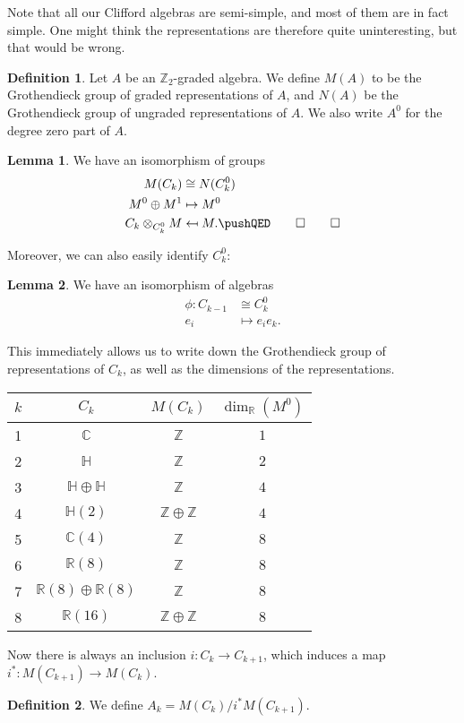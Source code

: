 \documentclass{shortart}
\theoremstyle{definition}
\newtheorem*{defi}{Definition}
\newtheorem*{lemma}{Lemma}
\newcommand\R{\mathbb{R}}
\newcommand\C{\mathbb{C}}
\renewcommand\H{\mathbb{H}}
\newcommand\Z{\mathbb{Z}}
\newcommand\leftmapsto{\mathrel{\reflectbox{\ensuremath{\mapsto}}}}
\begin{document}
Note that all our Clifford algebras are semi-simple, and most of them are in fact simple. One might think the representations are therefore quite uninteresting, but that would be wrong.

\begin{defi}
  Let $A$ be an $\Z_2$-graded algebra. We define $M(A)$ to be the Grothendieck group of graded representations of $A$, and $N(A)$ be the Grothendieck group of ungraded representations of $A$. We also write $A^0$ for the degree zero part of $A$.
\end{defi}

\begin{lemma}
  We have an isomorphism of groups
  \begin{align*}
    M(C_k) &\cong N(C_k^0)\\
    M^0 \oplus M^1 &\mapsto M^0\\
    C_k \otimes_{C_k^0} M &\leftmapsto M.\fakeqed
  \end{align*}
\end{lemma}
Moreover, we can also easily identify $C_k^0$:

\begin{lemma}
  We have an isomorphism of algebras
  \begin{align*}
    \phi: C_{k - 1} &\cong C_k^0\\
    e_i &\mapsto e_i e_k.
  \end{align*}
\end{lemma}

This immediately allows us to write down the Grothendieck group of representations of $C_k$, as well as the dimensions of the representations.
\begin{center}
  \begin{tabular}{cccc}
    \toprule
    $k$ & $C_k$ & $M(C_k)$ & $\dim_\R (M^0)$\\
    \midrule
    1 & $\C$ & $\Z$ & $1$ \\
    2 & $\H$ & $\Z$ & $2$ \\
    3 & $\H \oplus \H$ & $\Z$ & $4$ \\
    4 & $\H(2)$ & $\Z \oplus \Z$ & $4$\\
    5 & $\C(4)$ & $\Z$ & $8$\\
    6 & $\R(8)$ & $\Z$ & $8$\\
    7 & $\R(8) \oplus \R(8)$ & $\Z$ & $8$\\
    8 & $\R(16)$ & $\Z \oplus \Z$ & $8$\\
    \bottomrule
  \end{tabular}
\end{center}
Now there is always an inclusion $i: C_k \to C_{k + 1}$, which induces a map $i^*: M(C_{k + 1}) \to M(C_k)$.
\begin{defi}
  We define $A_k = M(C_k) / i^* M(C_{k + 1})$.
\end{defi}
\end{document}
